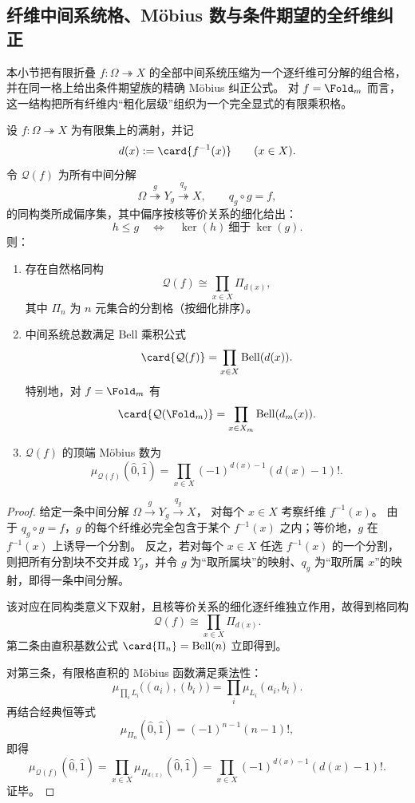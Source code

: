 \subsection{纤维中间系统格、Möbius 数与条件期望的全纤维纠正}\label{subsec:conclusion-fiber-intermediate-systems-mobius-correction}
本小节把有限折叠 \(f:\Omega\twoheadrightarrow X\) 的全部中间系统压缩为一个逐纤维可分解的组合格，并在同一格上给出条件期望族的精确 Möbius 纠正公式。
对 \(f=\Fold_m\) 而言，这一结构把所有纤维内“粗化层级”组织为一个完全显式的有限乘积格。

\begin{theorem}\label{thm:conclusion-fiber-intermediate-system-lattice-mobius}
设 \(f:\Omega\twoheadrightarrow X\) 为有限集上的满射，并记
\[
d(x):=\card{f^{-1}(x)}\qquad(x\in X).
\]
令 \(\mathcal Q(f)\) 为所有中间分解
\[
\Omega\overset{\,g\,}{\twoheadrightarrow}Y_g\overset{\,q_g\,}{\twoheadrightarrow}X,
\qquad
q_g\circ g=f,
\]
的同构类所成偏序集，其中偏序按核等价关系的细化给出：
\[
h\le g
\quad\Longleftrightarrow\quad
\ker(h)\ \text{细于}\ \ker(g).
\]
则：
\begin{enumerate}
\normalfont
  \item 存在自然格同构
  \[
  \mathcal Q(f)\cong \prod_{x\in X}\Pi_{d(x)},
  \]
  其中 \(\Pi_n\) 为 \(n\) 元集合的分割格（按细化排序）。
  \item 中间系统总数满足 Bell 乘积公式
  \[
  \card{\mathcal Q(f)}=\prod_{x\in X}\mathrm{Bell}(d(x)).
  \]
  特别地，对 \(f=\Fold_m\) 有
  \[
  \card{\mathcal Q(\Fold_m)}=\prod_{x\in X_m}\mathrm{Bell}(d_m(x)).
  \]
  \item \(\mathcal Q(f)\) 的顶端 Möbius 数为
  \[
  \mu_{\mathcal Q(f)}(\hat 0,\hat 1)
  =\prod_{x\in X}(-1)^{d(x)-1}(d(x)-1)!.
  \]
\end{enumerate}
\end{theorem}
\begin{proof}
给定一条中间分解
\(
\Omega\xrightarrow{g}Y_g\xrightarrow{q_g}X
\)，
对每个 \(x\in X\) 考察纤维 \(f^{-1}(x)\)。
由于 \(q_g\circ g=f\)，\(g\) 的每个纤维必完全包含于某个 \(f^{-1}(x)\) 之内；等价地，\(g\) 在 \(f^{-1}(x)\) 上诱导一个分割。
反之，若对每个 \(x\in X\) 任选 \(f^{-1}(x)\) 的一个分割，则把所有分割块不交并成 \(Y_g\)，并令 \(g\) 为“取所属块”的映射、\(q_g\) 为“取所属 \(x\)”的映射，即得一条中间分解。

该对应在同构类意义下双射，且核等价关系的细化逐纤维独立作用，故得到格同构
\[
\mathcal Q(f)\cong \prod_{x\in X}\Pi_{d(x)}.
\]
第二条由直积基数公式
\(
\card{\Pi_n}=\mathrm{Bell}(n)
\)
立即得到。

对第三条，有限格直积的 Möbius 函数满足乘法性：
\[
\mu_{\prod_i L_i}\bigl((a_i),(b_i)\bigr)=\prod_i\mu_{L_i}(a_i,b_i).
\]
再结合经典恒等式
\[
\mu_{\Pi_n}(\hat 0,\hat 1)=(-1)^{n-1}(n-1)!,
\]
即得
\[
\mu_{\mathcal Q(f)}(\hat 0,\hat 1)
=
\prod_{x\in X}\mu_{\Pi_{d(x)}}(\hat 0,\hat 1)
=
\prod_{x\in X}(-1)^{d(x)-1}(d(x)-1)!.
\]
证毕。
\end{proof}

